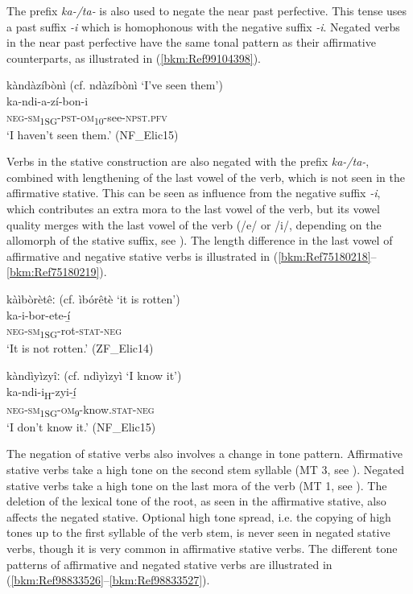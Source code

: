 The prefix \textit{ka-/ta-} is also used to negate the near past perfective. This tense uses a past suffix \textit{-i} which is homophonous with the negative suffix \textit{-i}. Negated verbs in the near past perfective have the same tonal pattern as their affirmative counterparts, as illustrated in (\ref{bkm:Ref99104398}).

\ea
\label{bkm:Ref99104398}
kàndàzíbònì (cf. ndàzíbònì ‘I’ve seen them’)\\
\gll ka-ndi-a-zí-bon-i\\
\textsc{neg}-\textsc{sm}\textsubscript{1SG}-\textsc{pst}-\textsc{om}\textsubscript{10}-see-\textsc{npst}.\textsc{pfv}\\
\glt ‘I haven’t seen them.’ (NF\_Elic15)
\z

Verbs in the stative construction are also negated with the prefix \textit{ka-/ta-}, combined with lengthening of the last vowel of the verb, which is not seen in the affirmative stative. This can be seen as influence from the negative suffix \textit{-i}, which contributes an extra mora to the last vowel of the verb, but its vowel quality merges with the last vowel of the verb (/e/ or /i/, depending on the allomorph of the stative suffix, see ). The length difference in the last vowel of affirmative and negative stative verbs is illustrated in (\ref{bkm:Ref75180218}--\ref{bkm:Ref75180219}).

\ea
\label{bkm:Ref75180218}
kàìbòrètêː (cf. ìbórêtè ‘it is rotten’)\\
\gll ka-i-bor-ete-í̲\\
\textsc{neg}-\textsc{sm}\textsubscript{1SG}-rot-\textsc{stat}-\textsc{neg}\\
\glt ‘It is not rotten.’ (ZF\_Elic14)
\z

\ea
\label{bkm:Ref75180219}
kàndìyìzyîː (cf. ndìyìzyì ‘I know it’)\\
\gll ka-ndi-i\textsubscript{H}-zyi-í̲\\
\textsc{neg}-\textsc{sm}\textsubscript{1SG}-\textsc{om}\textsubscript{9}-know.\textsc{stat}-\textsc{neg}\\
\glt ‘I don’t know it.’ (NF\_Elic15)
\z

The negation of stative verbs also involves a change in tone pattern. Affirmative stative verbs take a high tone on the second stem syllable (MT 3, see ). Negated stative verbs take a high tone on the last mora of the verb (MT 1, see ). The deletion of the lexical tone of the root, as seen in the affirmative stative, also affects the negated stative. Optional high tone spread, i.e. the copying of high tones up to the first syllable of the verb stem, is never seen in negated stative verbs, though it is very common in affirmative stative verbs. The different tone patterns of affirmative and negated stative verbs are illustrated in (\ref{bkm:Ref98833526}--\ref{bkm:Ref98833527}).

